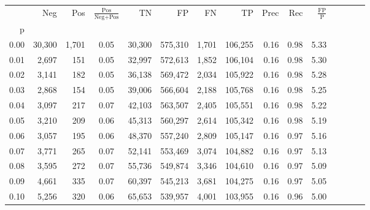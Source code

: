 \begin{tabular}{rrrcrrrrrrrrrrr}
\toprule
{} &     Neg &    Pos & $\frac{\text{Pos}}{\text{Neg}+\text{Pos}}$ &       TN &       FP &       FN &       TP &  Prec &   Rec & $\frac{\text{FP}}{\text{P}}$ \\
p    &         &        &                                            &          &          &          &          &       &       &                              \\
\midrule
0.00 &  30,300 &  1,701 &                                       0.05 &   30,300 &  575,310 &    1,701 &  106,255 &  0.16 &  0.98 &                         5.33 \\
0.01 &   2,697 &    151 &                                       0.05 &   32,997 &  572,613 &    1,852 &  106,104 &  0.16 &  0.98 &                         5.30 \\
0.02 &   3,141 &    182 &                                       0.05 &   36,138 &  569,472 &    2,034 &  105,922 &  0.16 &  0.98 &                         5.28 \\
0.03 &   2,868 &    154 &                                       0.05 &   39,006 &  566,604 &    2,188 &  105,768 &  0.16 &  0.98 &                         5.25 \\
0.04 &   3,097 &    217 &                                       0.07 &   42,103 &  563,507 &    2,405 &  105,551 &  0.16 &  0.98 &                         5.22 \\
0.05 &   3,210 &    209 &                                       0.06 &   45,313 &  560,297 &    2,614 &  105,342 &  0.16 &  0.98 &                         5.19 \\
0.06 &   3,057 &    195 &                                       0.06 &   48,370 &  557,240 &    2,809 &  105,147 &  0.16 &  0.97 &                         5.16 \\
0.07 &   3,771 &    265 &                                       0.07 &   52,141 &  553,469 &    3,074 &  104,882 &  0.16 &  0.97 &                         5.13 \\
0.08 &   3,595 &    272 &                                       0.07 &   55,736 &  549,874 &    3,346 &  104,610 &  0.16 &  0.97 &                         5.09 \\
0.09 &   4,661 &    335 &                                       0.07 &   60,397 &  545,213 &    3,681 &  104,275 &  0.16 &  0.97 &                         5.05 \\
0.10 &   5,256 &    320 &                                       0.06 &   65,653 &  539,957 &    4,001 &  103,955 &  0.16 &  0.96 &                         5.00 \\

\end{tabular}
